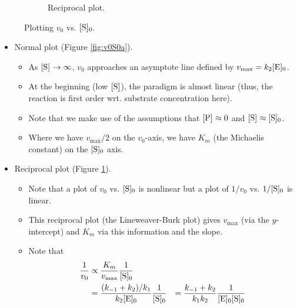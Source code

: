\documentclass[../notes.tex]{subfiles}
\begin{document}
\begin{itemize}
\begin{figure}[h!]
\begin{subfigure}[b]{0.45\linewidth}
            \caption{Reciprocal plot.}
            \label{fig:v0S0b}
        \end{subfigure}
        \caption{Plotting $v_0$ vs. $\cnc[0]{S}$.}
        \label{fig:v0S0}
    \end{figure}
    \begin{itemize}
        \item Normal plot (Figure \ref{fig:v0S0a}).
        \begin{itemize}
            \item As $\cnc{S}\to\infty$, $v_0$ approaches an asymptote line defined by $v_\text{max}=k_2\cnc[0]{E}$.
            \item At the beginning (low $\cnc{S}$), the paradigm is almost linear (thus, the reaction is first order wrt. substrate concentration here).
            \item Note that we make use of the assumptions that $\cnc{P}\approx 0$ and $\cnc{S}\approx\cnc[0]{S}$.
            \item Where we have $v_\text{max}/2$ on the $v_0$-axis, we have $K_m$ (the Michaelis constant) on the $\cnc[0]{S}$ axis.
        \end{itemize}
        \item Reciprocal plot (Figure \ref{fig:v0S0b}).
        \begin{itemize}
            \item Note that a plot of $v_0$ vs. $\cnc[0]{S}$ is nonlinear but a plot of $1/v_0$ vs. $1/\cnc[0]{S}$ is linear.
            \item This reciprocal plot (the Lineweaver-Burk plot) gives $v_\text{max}$ (via the $y$-intercept) and $K_m$ via this information and the slope.
            \item Note that
            \begin{align*}
                \frac{1}{v_0} &\propto \frac{K_m}{v_\text{max}}\frac{1}{\cnc[0]{S}}\\
                &= \frac{(k_{-1}+k_2)/k_1}{k_2\cnc[0]{E}}\frac{1}{\cnc[0]{S}}
                &= \frac{k_{-1}+k_2}{k_1k_2}\frac{1}{\cnc[0]{E}\cnc[0]{S}}
            \end{align*}
        \end{itemize}
    \end{itemize}

\end{itemize}
\end{document}
